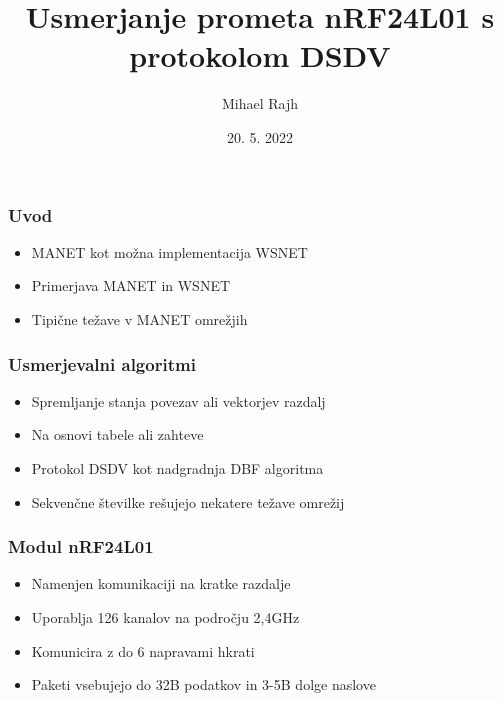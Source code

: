 \documentclass{beamer}
\title[DSDV \& nRF24L01]{Usmerjanje prometa nRF24L01 s protokolom DSDV} %
\author[Mihael Rajh]{Mihael Rajh} %
\institute[BSO projekti 21/22] %
{
Fakulteta za računalništvo in informatiko, Univerza v Ljubljani \\ %
}
\date{20. 5. 2022} %
\begin{document}
\begin{frame}
\titlepage %
\end{frame}




\begin{frame}
\frametitle{Uvod}
\begin{itemize}
\item MANET kot možna implementacija WSNET
\item Primerjava MANET in WSNET
\item Tipične težave v MANET omrežjih
\end{itemize}
\end{frame}

\begin{frame}
\frametitle{Usmerjevalni algoritmi}
\begin{itemize}
\item Spremljanje stanja povezav ali vektorjev razdalj
\item Na osnovi tabele ali zahteve
\item Protokol DSDV kot nadgradnja DBF algoritma
\item Sekvenčne številke rešujejo nekatere težave omrežij
\end{itemize}
\end{frame}

\begin{frame}
\frametitle{Modul nRF24L01}
\begin{itemize}
\item Namenjen komunikaciji na kratke razdalje
\item Uporablja 126 kanalov na področju 2,4GHz
\item Komunicira z do 6 napravami hkrati
\item Paketi vsebujejo do 32B podatkov in 3-5B dolge naslove
\end{itemize}
\end{frame}
\end{document}
